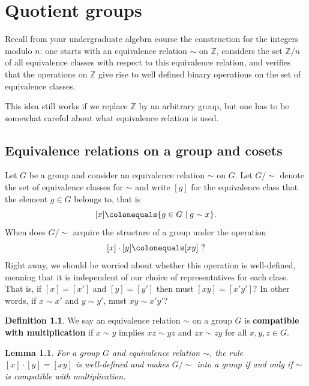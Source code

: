 \documentclass[12pt]{report}
\newtheorem{lemma}[theorem]{Lemma}
\numberwithin{equation}{section}
\numberwithin{theorem}{chapter}
\theoremstyle{definition}
\newtheorem{definition}[theorem]{Definition}
\newtheorem*{basic properties}{Basic Properties}
\newtheorem*{Important Remark}{Important Remark}
\newcommand{\Z}{\mathbb{Z}}
\begin{document}
\chapter{Quotient groups}

Recall from your undergraduate algebra course the construction for the integers modulo $n$: one starts with an equivalence relation $\sim$ on $\Z$, considers the set $\Z/n$ of all equivalence classes with respect to this equivalence relation, and verifies that the operations on $\Z$ give rise to well defined binary operations on the set of equivalence classes. 

This idea still works if we replace $\Z$ by an arbitrary group, but one has to be somewhat careful about what equivalence relation is used. 

\section{Equivalence relations on a group and cosets}
 
Let $G$ be a group and consider an equivalence relation $\sim$ on $G$.
Let $G/\sim$ denote the set of equivalence classes for $\sim$ and write $[g]$ for the equivalence class that the element $g \in G$ belongs to, that is
$$[x] \colonequals \{g \in G \mid g \sim x\}.$$
When does $G/\sim$ acquire the structure of a group under the operation
$$[x] \cdot [y] \colonequals [xy] \ ?$$
Right away, we should be worried about whether this operation is well-defined, meaning that it is independent of our choice of representatives for each class. That is, if $[x] = [x']$ and $[y] = [y']$  then must $[xy] = [x'y']$? In other words, if $x \sim x'$ and $y \sim y'$, must $xy \sim x'y'$? 


\begin{definition}
We say an equivalence relation $\sim$ on a group $G$ is {\bf compatible with multiplication} if $x \sim y$ implies $xz \sim yz$ and $zx \sim zy$ for all $x,y,z \in G$.
 \end{definition}

\begin{lemma}\label{quotient group operation well-defined}
For a group $G$ and equivalence relation $\sim$, the rule $[x] \cdot [y] = [xy]$ is well-defined and makes $G/\sim$ into a group if and only if $\sim$ is compatible with multiplication.
\end{lemma}
\end{document}
